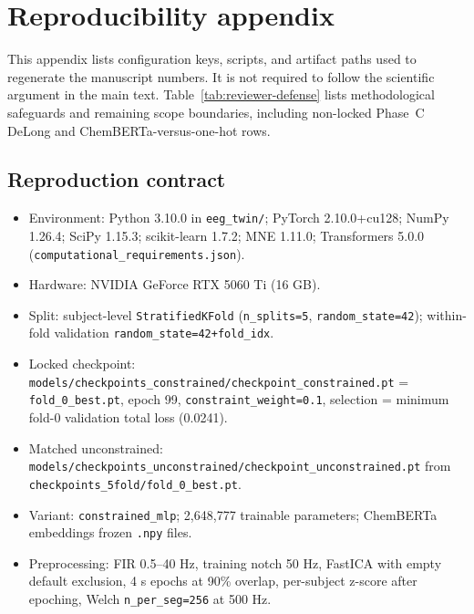 \section{Reproducibility appendix}
\label{sec:supp-repro}
This appendix lists configuration keys, scripts, and artifact paths used to regenerate the manuscript numbers. It is not required to follow the scientific argument in the main text. Table~\ref{tab:reviewer-defense} lists methodological safeguards and remaining scope boundaries, including non-locked Phase~C DeLong and ChemBERTa-versus-one-hot rows.


\subsection{Reproduction contract}

\begin{itemize}
  \item Environment: Python 3.10.0 in \texttt{eeg\_twin/}; PyTorch 2.10.0+cu128; NumPy 1.26.4; SciPy 1.15.3; scikit-learn 1.7.2; MNE 1.11.0; Transformers 5.0.0 (\texttt{computational\_\allowbreak{}requirements.\allowbreak{}json}).
  \item Hardware: NVIDIA GeForce RTX 5060 Ti (16 GB).
  \item Split: subject-level \texttt{StratifiedKFold} (\texttt{n\_splits=5}, \texttt{random\_\allowbreak{}state=42}); within-fold validation \texttt{random\_\allowbreak{}state=42+fold\_\allowbreak{}idx}.
  \item Locked checkpoint: \texttt{models/\allowbreak{}checkpoints\_\allowbreak{}constrained/\allowbreak{}checkpoint\_\allowbreak{}constrained.\allowbreak{}pt} = \texttt{fold\_\allowbreak{}0\_\allowbreak{}best.\allowbreak{}pt}, epoch 99, \texttt{constraint\_\allowbreak{}weight=0.\allowbreak{}1}, selection = minimum fold-0 validation total loss (0.0241).
  \item Matched unconstrained: \texttt{models/\allowbreak{}checkpoints\_\allowbreak{}unconstrained/\allowbreak{}checkpoint\_\allowbreak{}unconstrained.\allowbreak{}pt} from \texttt{checkpoints\_\allowbreak{}5fold/\allowbreak{}fold\_\allowbreak{}0\_\allowbreak{}best.\allowbreak{}pt}.
  \item Variant: \texttt{constrained\_\allowbreak{}mlp}; 2,648,777 trainable parameters; ChemBERTa embeddings frozen \texttt{.npy} files.
  \item Preprocessing: FIR 0.5--40 Hz, training notch 50 Hz, FastICA with empty default exclusion, 4 s epochs at 90\% overlap, per-subject z-score after epoching, Welch \texttt{n\_\allowbreak{}per\_\allowbreak{}seg=256} at 500 Hz.

\end{itemize}
